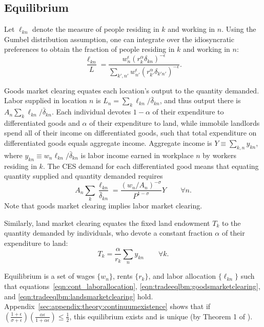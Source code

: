 \documentclass[11pt]{article}
\theoremstyle{definition}
\newcommand\idiosyncraticphrase{idiosyncratic preference}
\begin{document}
\subsection{Equilibrium}\label{sec:cont_model:eqm}

Let $\ell_{kn}$ denote the measure of people residing in $k$ and working in $n$.
Using the Gumbel distribution assumption,
one can integrate over the \idiosyncraticphrase s to obtain the fraction of people residing in $k$ and working in $n$:
\begin{equation}\label{eqn:cont_laborallocation}
\frac{\ell_{kn}}{L}
=
\frac
{w_{n}^\epsilon \left(r_{k}^\alpha  \delta_{kn}\right)^{-\epsilon}}
{\sum_{k',n'}w_{n'}^\epsilon \left(r_{k'}^\alpha  \delta_{k'n'}\right)^{-\epsilon}}
.
\end{equation}

Goods market clearing equates each location's output to the quantity demanded.
Labor supplied in location $n$ is $L_n = \sum_{k} \ell_{kn}/\bar{\delta}_{kn}$,
and thus output there is $A_n \sum_k \ell_{kn}/\bar{\delta}_{kn}$.
Each individual devotes $1-\alpha$ of their expenditure to differentiated goods
and
$\alpha$ of their expenditure to land,
while immobile landlords spend all of their income on differentiated goods,
such that total expenditure on differentiated goods equals aggregate income.
Aggregate income is $Y \equiv \sum_{k,n} y_{kn}$,
where $y_{kn} \equiv w_{n} \ell_{kn} / \bar{\delta}_{kn}$ is labor income earned in workplace $n$ by workers residing in $k$.
The CES demand for each differentiated good
means that equating quantity supplied and quantity demanded requires
\begin{equation}\label{eqn:tradeeqlbm:goodsmarketclearing}
A_n \sum_k \frac{\ell_{kn}}{\bar{\delta}_{kn}} 
=
\frac{\left({w_n}/{A_n}\right)^{-\sigma}}{P^{1-\sigma}} Y \qquad \forall n
.
\end{equation}
Note that goods market clearing implies labor market clearing.

Similarly, land market clearing equates the fixed land endowment $T_{k}$ to the quantity demanded by individuals, who devote a constant fraction $\alpha$ of their expenditure to land:
\begin{equation}\label{eqn:tradeeqlbm:landsmarketclearing} 
T_k = \frac{\alpha}{r_k} \sum_n y_{kn} \qquad \forall k.
\end{equation}

Equilibrium is a set of wages $\{w_n\}$, rents $\{r_k\}$, and labor allocation $\{\ell_{kn}\}$
such that equations~\eqref{eqn:cont_laborallocation}, \eqref{eqn:tradeeqlbm:goodsmarketclearing}, and \eqref{eqn:tradeeqlbm:landsmarketclearing} hold.
Appendix~\ref{sec:appendix:theory:continuumexistence} shows that if
$\left(\frac{1+\epsilon}{\sigma + \epsilon}\right) \left(\frac{\alpha \epsilon}{1+\alpha \epsilon}\right) \leq \frac{1}{2}$,
this equilibrium exists and is unique (by Theorem 1 of \citealt{AllenArkolakisLi:2023}).
\end{document}

